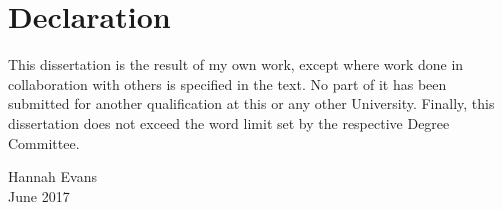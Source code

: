 
\chapter{{\Large Declaration}}

This dissertation is the result of my own work, except where work done in collaboration with others is specified in the text. No part of it has been submitted for another qualification at this or any other University. Finally, this dissertation does not exceed the word limit set by the respective Degree Committee. %

\begin{flushright}
Hannah Evans \\
June 2017
\end{flushright}




